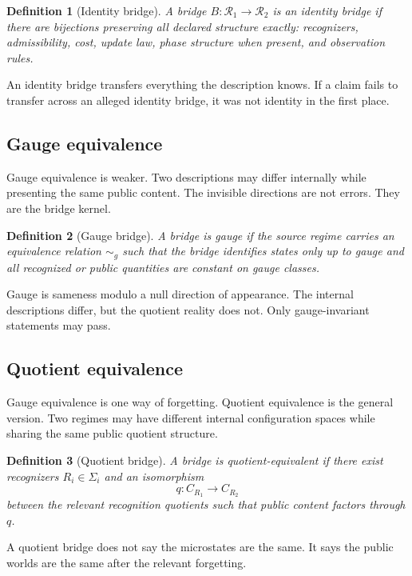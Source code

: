 \documentclass[11pt]{article}
\newtheorem{definition}{Definition}
\begin{document}
\begin{definition}[Identity bridge]
A bridge $B:\mathcal{R}_1\to\mathcal{R}_2$ is an identity bridge if there are bijections preserving all declared structure exactly: recognizers, admissibility, cost, update law, phase structure when present, and observation rules.
\end{definition}

An identity bridge transfers everything the description knows. If a claim fails to transfer across an alleged identity bridge, it was not identity in the first place.

\subsection*{Gauge equivalence}

Gauge equivalence is weaker. Two descriptions may differ internally while presenting the same public content. The invisible directions are not errors. They are the bridge kernel.

\begin{definition}[Gauge bridge]
A bridge is gauge if the source regime carries an equivalence relation $\sim_g$ such that the bridge identifies states only up to gauge and all recognized or public quantities are constant on gauge classes.
\end{definition}

Gauge is sameness modulo a null direction of appearance. The internal descriptions differ, but the quotient reality does not. Only gauge-invariant statements may pass.

\subsection*{Quotient equivalence}

Gauge equivalence is one way of forgetting. Quotient equivalence is the general version. Two regimes may have different internal configuration spaces while sharing the same public quotient structure.

\begin{definition}[Quotient bridge]
A bridge is quotient-equivalent if there exist recognizers $R_i\in\Sigma_i$ and an isomorphism
\[
q:C_{R_1}\to C_{R_2}
\]
between the relevant recognition quotients such that public content factors through $q$.
\end{definition}

A quotient bridge does not say the microstates are the same. It says the public worlds are the same after the relevant forgetting.
\end{document}
